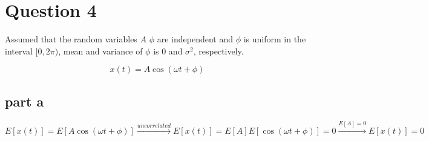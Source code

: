 \section{Question 4}
Assumed that the random variables $A$ $\phi$ are independent and $\phi$ is uniform in the interval $[0, 2\pi)$, mean and variance of $\phi$ is $0$ and $\sigma^2$, respectively.

$$
x(t) = A\cos(\omega t + \phi)
$$
\subsection{part a}
$$
E\left[x(t)\right] = E\left[A\cos(\omega t + \phi)\right] \xrightarrow{uncorrelated} E\left[x(t)\right]
 = E[A]E[\cos(\omega t + \phi)] = 0
\xrightarrow{E[A] = 0} E\left[x(t)\right] = 0$$
